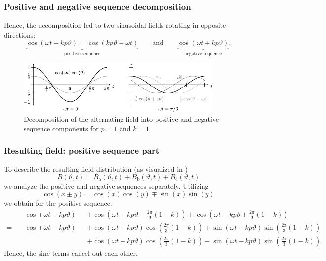 \begin{frame}
	\frametitle{Positive and negative sequence decomposition}
    Hence, the decomposition led to two sinusoidal fields rotating in opposite directions:
    $$\underbrace{\cos(\omega t - k p \vartheta)=\cos(k p \vartheta - \omega t)}_{\mbox{positive sequence}} \qquad  \mbox{and} \qquad \underbrace{\cos(\omega t + k p \vartheta)}_{\mbox{negative sequence}}.$$
    \begin{figure}
        \centering
        \includegraphics[width=0.9\textwidth]{fig/lec05/Positive_negative_sequence_components.pdf}
        \caption{Decomposition of the alternating field into positive and negative sequence components for $p=1$ and $k=1$}
        \label{fig:Positive_negative_sequence_components}
    \end{figure}
\end{frame}

\begin{frame}
	\frametitle{Resulting field: positive sequence part}
    To describe the resulting field distribution (as visualized in ) 
    \begin{equation}
        B(\vartheta, t) = B_\mathrm{a}(\vartheta, t) + B_\mathrm{b}(\vartheta, t) + B_\mathrm{c}(\vartheta, t)
    \end{equation}
    we analyze the positive and negative sequences separately. Utilizing $$\cos(x \pm y) = \cos(x)\cos(y) \mp \sin(x)\sin(y)$$ we obtain for the positive sequence:
    \begin{equation*}
        \begin{alignedat}{2}
        &\cos(\omega t - k p \vartheta) &&+ \cos(\omega t - k p \vartheta - \frac{2\pi}{3}(1-k)) + \cos(\omega t - k p \vartheta + \frac{2\pi}{3}(1-k))\\
         = \quad &\cos(\omega t - k p \vartheta) &&+ \cos(\omega t - k p \vartheta) \cos(\frac{2\pi}{3}(1-k)) + \sin(\omega t - k p \vartheta) \sin(\frac{2\pi}{3}(1-k))\\
         & &&+ \cos(\omega t - k p \vartheta) \cos(\frac{2\pi}{3}(1-k)) - \sin(\omega t - k p \vartheta)\sin(\frac{2\pi}{3}(1-k)).   
        \end{alignedat}
    \end{equation*}
    Hence, the sine terms cancel out each other.
\end{frame}


